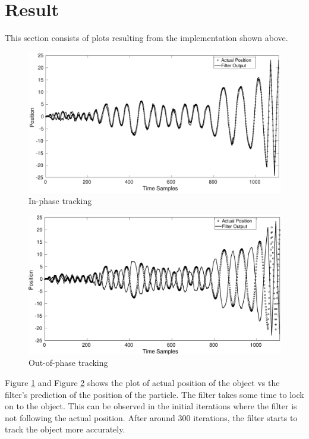 \documentclass[12pt]{article}
\begin{document}
\section{Result}
This section consists of plots resulting from the implementation shown above. \\

\begin{figure}[b]
\centering
	\includegraphics[scale = 0.3]{./Figures/inphase.eps}
	\caption{In-phase tracking}
	\label{fig:inphase}
\end{figure}

\begin{figure}[t]
\centering
	\includegraphics[scale = 0.3]{./Figures/outphase.eps}
	\caption{Out-of-phase tracking}
	\label{fig:outphase}
\end{figure}

Figure \ref{fig:inphase} and Figure \ref{fig:outphase} shows the plot of actual position of the object vs the filter's prediction of the position of the particle. The filter takes some time to lock on to the object. This can be observed in the initial iterations where the filter is not following the actual position. After around 300 iterations, the filter starts to track the object more accurately.\\
\end{document}
